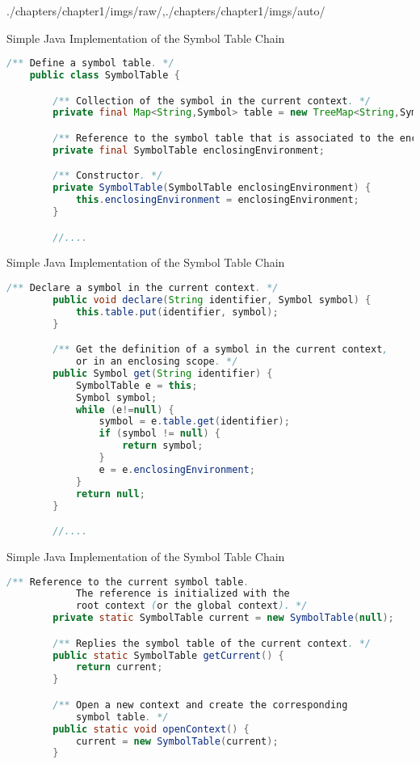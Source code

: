 \begin{graphicspathcontext}{{./chapters/chapter1/imgs/raw/},{./chapters/chapter1/imgs/auto/}}
\begin{bibunit}[apalike]
\begin{frame}[fragile]{Simple Java Implementation of the Symbol Table Chain}
\begin{lstlisting}[language=Java]
	/** Define a symbol table. */
	public class SymbolTable {

	    /** Collection of the symbol in the current context. */
	    private final Map<String,Symbol> table = new TreeMap<String,Symbol>();

	    /** Reference to the symbol table that is associated to the enclosing scope. */
	    private final SymbolTable enclosingEnvironment;

	    /** Constructor. */
	    private SymbolTable(SymbolTable enclosingEnvironment) {
	        this.enclosingEnvironment = enclosingEnvironment;
	    }

	    //....
	\end{lstlisting}
\end{frame}

\begin{frame}[fragile]{Simple Java Implementation of the Symbol Table Chain}
	\begin{lstlisting}[language=Java]
	    /** Declare a symbol in the current context. */
	    public void declare(String identifier, Symbol symbol) {
	        this.table.put(identifier, symbol);
	    }

	    /** Get the definition of a symbol in the current context,
	        or in an enclosing scope. */
	    public Symbol get(String identifier) {
	        SymbolTable e = this;
	        Symbol symbol;
	        while (e!=null) {
	            symbol = e.table.get(identifier);
	            if (symbol != null) {
	                return symbol;
	            }
	            e = e.enclosingEnvironment;
	        }
	        return null;
	    }

	    //....
	\end{lstlisting}
\end{frame}

\begin{frame}[fragile]{Simple Java Implementation of the Symbol Table Chain}
	\begin{lstlisting}[language=Java]
	    /** Reference to the current symbol table.
	        The reference is initialized with the
	        root context (or the global context). */
	    private static SymbolTable current = new SymbolTable(null);

	    /** Replies the symbol table of the current context. */
	    public static SymbolTable getCurrent() {
	        return current;
	    }

	    /** Open a new context and create the corresponding
	        symbol table. */
	    public static void openContext() {
	        current = new SymbolTable(current);
	    }


\end{lstlisting}
\end{frame}
\end{bibunit}
\end{graphicspathcontext}
